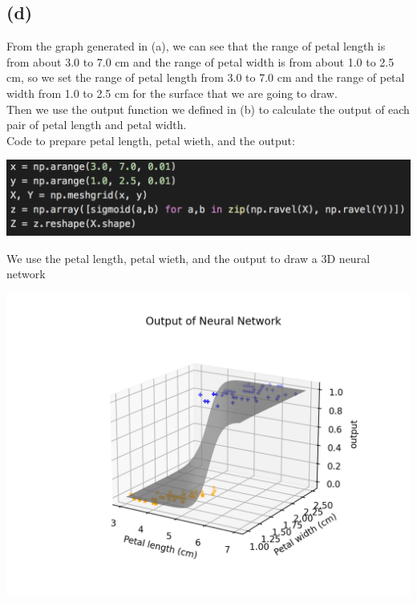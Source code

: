 \documentclass[12pt]{article}
\begin{document}
\subsection*{(d)}
From the graph generated in (a), we can see that the range of petal length is from about 3.0 to 7.0 cm and the range of petal width is from about 1.0 to 2.5 cm,
so we set the range of petal length from 3.0 to 7.0 cm and the range of petal width from 1.0 to 2.5 cm for the surface that we are going to draw. \\
Then we use the output function we defined in (b) to calculate the output of each pair of petal length and petal width. \\
Code to prepare petal length, petal wieth, and the output:
\begin{center}
    \includegraphics[scale=0.50]{fig/ai1d2.png}
\end{center}
We use the petal length, petal wieth, and the output to draw a 3D neural network
\begin{center}
    \includegraphics[scale=0.50]{fig/ai1d.png}
\end{center}
\end{document}
